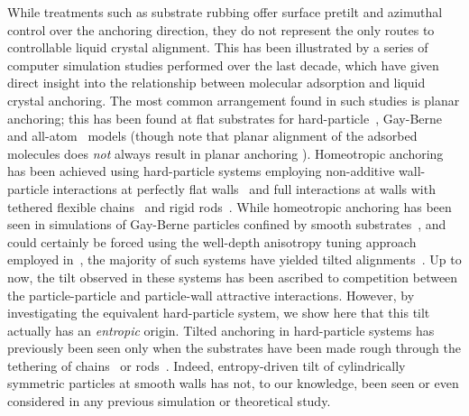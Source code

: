 \documentclass[aps,10pt,twocolumn]{revtex4}
\begin{document}
While treatments such as substrate rubbing offer surface pretilt and azimuthal control over the anchoring
direction, they do not represent the only routes to controllable liquid crystal alignment. This has been
illustrated by a series of computer simulation studies performed over the last decade, which have given direct
insight into the relationship between molecular adsorption and liquid crystal anchoring. The most common
arrangement found in such studies is planar anchoring; this has been found at flat substrates for
hard-particle~\cite{VanRoijDijkstra00,DijkstraVanRoij01,Chrzanowska_Teixera_01,BarmesCleaver04a},
Gay-Berne~\cite{WallCleaver03} and all-atom~\cite{BingerHanna01} models (though note that planar alignment of the
adsorbed molecules does \emph{not} always result in planar anchoring \cite{PalermoBiscarini98}). Homeotropic
anchoring has been achieved using hard-particle systems employing non-additive wall-particle interactions at
perfectly flat walls~\cite{Allen99,Cleaver_Teixeira_01,Chrzanowska_Teixera_01,LangeSchmid02,BarmesCleaver04a} and
full interactions at walls with tethered flexible chains~\cite{LangeSchmid02,LangeSchmid02a,LangeSchmid02c} and
rigid rods~\cite{DowntonAllen04}. While homeotropic anchoring has been seen in simulations of Gay-Berne particles
confined by smooth substrates~\cite{WallCleaver03}, and could certainly be forced using the well-depth anisotropy
tuning approach employed in~\cite{AntypovCleaver04}, the majority of such systems have yielded tilted
alignments~\cite{ZhangChakrabarti96,WallCleaver97,TeixeiraChrzanowska01,WebsterCleaver03}. Up to now, the tilt
observed in these systems has been ascribed to competition between the particle-particle and particle-wall
attractive interactions. However, by investigating the equivalent hard-particle system, we show here that this
tilt actually has an \emph{entropic} origin. Tilted anchoring in hard-particle systems has previously been seen
only when the substrates have been made rough through the tethering of
chains~\cite{LangeSchmid02,LangeSchmid02a,LangeSchmid02c} or rods~\cite{DowntonAllen04}. Indeed, entropy-driven
tilt of cylindrically symmetric particles at smooth walls has not, to our knowledge, been seen or even considered
in any previous simulation or theoretical study.
\end{document}

